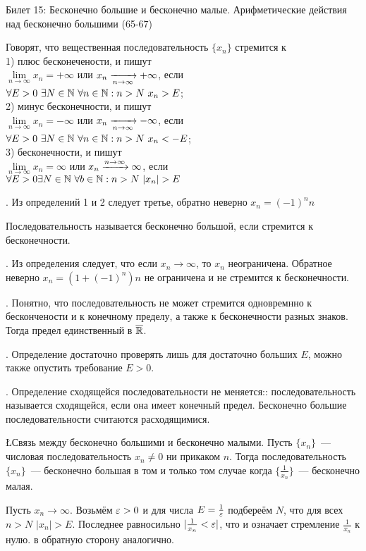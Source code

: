 Билет 15: Бесконечно большие и бесконечно малые. Арифметические действия над бесконечно большими
(65-67)

\Op Говорят, что вещественная последовательность $\{x_n\}$ стремится к\\
1) плюс бесконечености, и пишут\\
$\lim\limits_{n\to\infty} x_n = +\infty$ или $x_n \xrightarrow[n\to\infty]{} +\infty$, если\\
$\forall E > 0\ \exists N \in \mathbb{N}\ \forall n \in \mathbb{N}: n > N\ x_n > E$;\\
2) минус бесконечности, и пишут\\
$\lim\limits_{n\to \infty} x_n = -\infty$ или $x_n \xrightarrow[n\to \infty]{} -\infty$, если\\
$\forall E > 0\ \exists N\in\mathbb{N}\ \forall n\in\mathbb{N}: n > N\ x_n < -E$;\\
3) бесконечности, и пишут\\
$\lim\limits_{n\to \infty} x_n = \infty$ или $x_n\xrightarrow[]{n\to\infty} \infty$, если\\
$\forall E > 0 \exists N \in \mathbb{N}\ \forall b \in \mathbb{N}: n > N\ |x_n| > E$

. Из определений 1 и 2 следует третье, обратно неверно $x_n = (-1)^nn$

\Op Последовательность называется бесконечно большой, если стремится к бесконечности.

. Из определения следует, что если $x_n\to\infty$, то $x_n$ неограничена. Обратное неверно $x_n = (1 + (-1) ^n)n$ не ограничена и не стремится к бесконечности.

. Понятно, что последовательность не может стремится одновремнно к бескончености и к конечному пределу, а также к бесконечности разных знаков. Тогда предел единственный в $\overline{\mathbb{R}}$.

. Определение достаточно проверять лишь для достаточно больших $E$, можно также опустить требование $E > 0$.

. Определение сходящейся последовательности не меняется:: последовательность называется сходящейся, если она имеет конечный предел. Бесконечно большие последовательности считаются расходящимися.

\L \q Связь между бесконечно большими и бесконечно малыми. Пусть $\{x_n\}$~--- числовая последовательность $x_n\neq 0$ ни прикаком $n$. Тогда последовательность $\{x_n\}$~--- бесконечно большая в том и только том случае когда $\{\frac{1}{x_n}\}$~--- бесконечно малая.

\D Пусть $x_n\to\infty$. Возьмём $\varepsilon > 0$ и для числа $E = \frac{1}{\varepsilon}$ подбереём $N$, что для всех $n > N$ $|x_n| > E$. Последнее равносильно $|\frac{1}{x_n} < \varepsilon|$, что и означает стремление $\frac{1}{x_n}$ к нулю. в обратную сторону аналогично.

